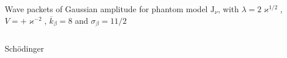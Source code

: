 \documentclass[9pt]{beamer}
\begin{document}
\begin{frame}%
{Wave packets of Gaussian amplitude for phantom model}%
{$\mathrm{J}_{\nu}$, with $\lambda = 2\varkappa^{1/2}$,
$V = +\varkappa^{-2}$, $\overline{k}_\beta = 8$ and $\sigma_\beta = 11/2$}
\begin{columns}
\begin{column}{.49\textwidth}
\begin{block}{Schödinger}

\end{block}
\end{column}
\end{columns}
\end{frame}
\end{document}
